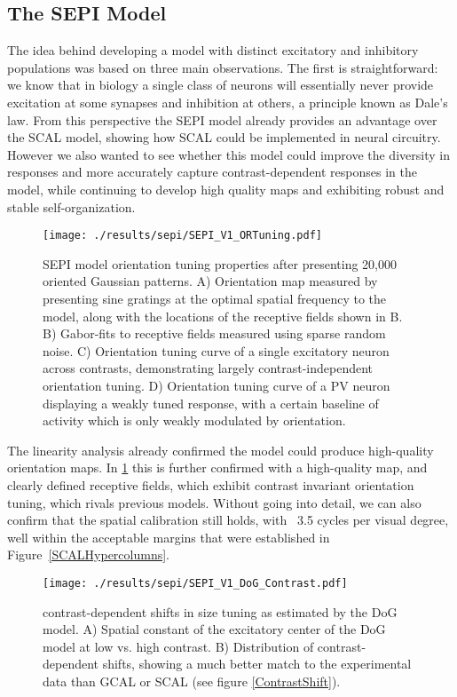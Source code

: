 \subsection{The SEPI Model}

The idea behind developing a model with distinct excitatory and
inhibitory populations was based on three main observations. The first
is straightforward: we know that in biology a single class of neurons
will essentially never provide excitation at some synapses and
inhibition at others, a principle known as Dale's law. From this
perspective the SEPI model already provides an advantage over the SCAL
model, showing how SCAL could be implemented in neural
circuitry. However we also wanted to see whether this model could
improve the diversity in responses and more accurately capture
contrast-dependent responses in the model, while continuing to develop
high quality maps and exhibiting robust and stable self-organization.

\begin{figure}
	\centering
    \texttt{[image: ./results/sepi/SEPI\_V1\_ORTuning.pdf]}
	\caption{SEPI model orientation tuning properties after presenting
      20,000 oriented Gaussian patterns. A) Orientation map measured
      by presenting sine gratings at the optimal spatial frequency to
      the model, along with the locations of the receptive fields
      shown in B. B) Gabor-fits to receptive fields measured using
      sparse random noise. C) Orientation tuning curve of a single
      excitatory neuron across contrasts, demonstrating largely
      contrast-independent orientation tuning. D) Orientation tuning
      curve of a PV neuron displaying a weakly tuned response, with a
      certain baseline of activity which is only weakly modulated by
      orientation.}
	\label{SEPIORTuning}
\end{figure}

The linearity analysis already confirmed the model could produce
high-quality orientation maps. In \ref{SEPIORTuning} this is further
confirmed with a high-quality map, and clearly defined receptive
fields, which exhibit contrast invariant orientation tuning, which
rivals previous models. Without going into detail, we can also confirm
that the spatial calibration still holds, with ~3.5 cycles per visual
degree, well within the acceptable margins that were established in
Figure~\ref{SCALHypercolumns}.

\begin{figure}
	\centering
        \texttt{[image: ./results/sepi/SEPI\_V1\_DoG\_Contrast.pdf]}
	\caption{contrast-dependent shifts in size tuning as estimated by
      the DoG model. A) Spatial constant of the excitatory center of
      the DoG model at low vs. high contrast. B) Distribution of
      contrast-dependent shifts, showing a much better match to the
      experimental data than GCAL or SCAL (see figure
      \ref{ContrastShift}).}
	\label{SEPI_DoG_Contrast}
\end{figure}


